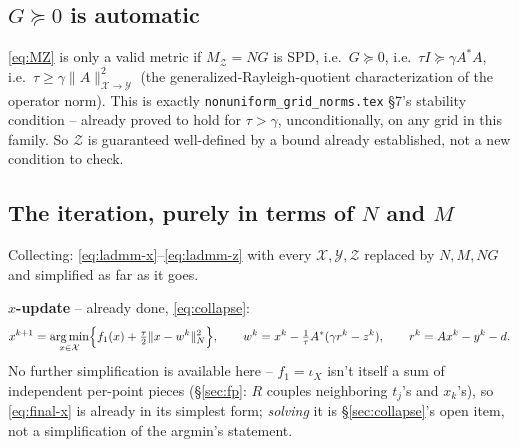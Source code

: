 \documentclass[11pt]{article}
\newcommand{\code}[1]{\texttt{#1}}
\DeclareMathOperator*{\argmin}{arg\,min}
\begin{document}
\subsection{$G\succeq0$ is automatic}

\eqref{eq:MZ} is only a valid metric if $M_\mathcal Z=NG$ is SPD, i.e.\ $G\succeq0$, i.e.\
$\tau I\succeq\gamma A^*A$, i.e.\ $\tau\ge\gamma\|A\|_{\mathcal X\to\mathcal Y}^2$ (the
generalized-Rayleigh-quotient characterization of the operator norm). This is exactly
\code{nonuniform\_grid\_norms.tex} \S7's stability condition -- already proved to hold
for $\tau>\gamma$, unconditionally, on any grid in this family. So $\mathcal Z$ is
guaranteed well-defined by a bound already established, not a new condition to check.

\subsection{The iteration, purely in terms of $N$ and $M$}
\label{sec:final-iteration}

Collecting: \eqref{eq:ladmm-x}--\eqref{eq:ladmm-z} with every $\mathcal X,\mathcal Y,
\mathcal Z$ replaced by $N,M,NG$ and simplified as far as it goes.

\textbf{$x$-update} -- already done, \eqref{eq:collapse}:
\begin{equation}
  \label{eq:final-x}
  x^{k+1} = \argmin_{x\in\mathcal X}\Bigl\{f_1(x)+\tfrac\tau2\|x-w^k\|_N^2\Bigr\},
  \qquad w^k = x^k-\tfrac1\tau A^*(\gamma r^k-z^k),
  \qquad r^k=Ax^k-y^k-d.
\end{equation}
No further simplification is available here -- $f_1=\iota_X$ isn't itself a sum of
independent per-point pieces (\S\ref{sec:fp}: $R$ couples neighboring $t_j$'s and
$x_k$'s), so \eqref{eq:final-x} is already in its simplest form; \emph{solving} it is
\S\ref{sec:collapse}'s open item, not a simplification of the argmin's statement.
\end{document}
